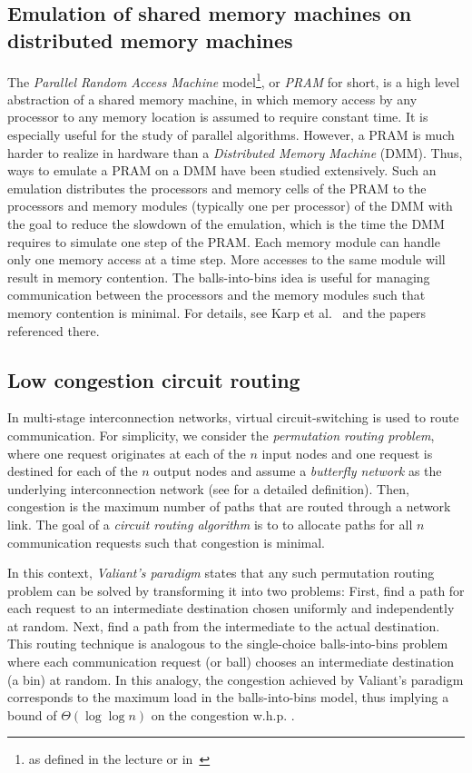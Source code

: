 \documentclass[a4paper,12pt]{article}
\begin{document}
\subsection{Emulation of shared memory machines on distributed memory machines}
\label{sec:DMM}
The \emph{Parallel Random Access Machine} model\footnote{as defined in the lecture or in~\cite{P03}}, or \emph{PRAM} for short, is a high level abstraction of a shared memory machine, in which memory access by any processor to any memory location is assumed to require constant time. It is especially useful for the study of parallel algorithms. However, a PRAM is much harder to realize in hardware than a \emph{Distributed Memory Machine} (DMM). Thus, ways to emulate a PRAM on a DMM have been studied extensively. Such an emulation distributes the processors and memory cells of the PRAM to the processors and memory modules (typically one per processor) of the DMM with the goal to reduce the slowdown of the emulation, which is the time the DMM requires to simulate one step of the PRAM. Each memory module can handle only one memory access at a time step. More accesses to the same module will result in memory contention. The balls-into-bins idea is useful for managing communication between the processors and the memory modules such that memory contention is minimal. For details, see Karp et al.~\cite{KLM92} and the papers referenced there. 
 
\subsection{Low congestion circuit routing}
\label{sec:circuitrouting}
In multi-stage interconnection networks, virtual circuit-switching is used to route communication. For simplicity, we consider the \emph{permutation routing problem}, where one request originates at each of the $n$ input nodes and one request is destined for each of the $n$ output nodes and assume a \emph{butterfly network} as the underlying interconnection network (see \cite{CLR09} for a detailed definition). Then, congestion is the maximum number of paths that are routed through a network link. The goal of a \emph{circuit routing algorithm} is to to allocate paths for all $n$ communication requests such that congestion is minimal.

In this context, \emph{Valiant's paradigm} \cite{V82} states that any such permutation routing problem can be solved by transforming it into two problems: First, find a path for each request to an intermediate destination chosen uniformly and independently at random. Next, find a path from the intermediate to the actual destination. This routing technique is analogous to the single-choice balls-into-bins problem where each communication request (or ball) chooses an intermediate destination (a bin) at random. In this analogy, the congestion achieved by Valiant's paradigm corresponds to the maximum load in the balls-into-bins model, thus implying a bound of $\Theta\left(\log \log n\right)$ on the congestion w.h.p. \cite{CMM+98} \cite{MRS01}. 
\end{document}
